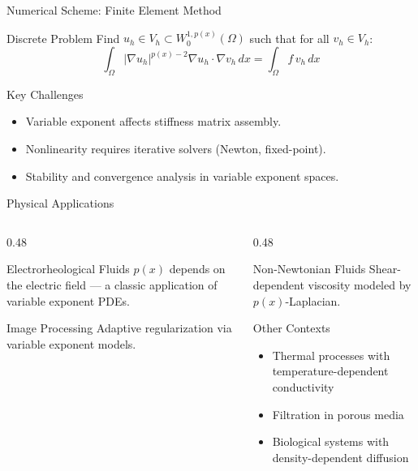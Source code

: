 \documentclass[11pt]{beamer}
\let\oldcite\cite
\renewcommand{\cite}[1]{\textcolor{red}{\textbf{\oldcite{#1}}}}
\begin{document}
	\begin{frame}{Numerical Scheme: Finite Element Method \cite{chipot2000,evans2010}}
		\begin{block}{Discrete Problem}
			Find $u_h \in V_h \subset W^{1, p(x)}_0(\Omega)$ such that for all $v_h \in V_h$:
			\[
			\int_\Omega |\nabla u_h|^{p(x)-2} \nabla u_h \cdot \nabla v_h \, dx = \int_\Omega f \, v_h \, dx
			\]
		\end{block}
		
		\begin{block}{Key Challenges}
			\begin{itemize}
				\item Variable exponent affects stiffness matrix assembly.
				\item Nonlinearity requires iterative solvers (Newton, fixed-point).
				\item Stability and convergence analysis in variable exponent spaces.
			\end{itemize}
		\end{block}
	\end{frame}
	
	\begin{frame}{Physical Applications \cite{ruzi2000,fan2015}}
		\begin{columns}[T]
			\begin{column}{0.48\textwidth}
				\begin{block}{Electrorheological Fluids \cite{ruzi2000}}
					$p(x)$ depends on the electric field — a classic application of variable exponent PDEs.
				\end{block}
				
				\begin{block}{Image Processing}
					Adaptive regularization via variable exponent models.
				\end{block}
			\end{column}
			
			\begin{column}{0.48\textwidth}
				\begin{block}{Non-Newtonian Fluids}
					Shear-dependent viscosity modeled by $p(x)$-Laplacian.
				\end{block}
				
				\begin{block}{Other Contexts}
					\begin{itemize}
						\item Thermal processes with temperature-dependent conductivity
						\item Filtration in porous media
						\item Biological systems with density-dependent diffusion
					\end{itemize}
				\end{block}
			\end{column}
		\end{columns}
	\end{frame}
	
\end{document}
